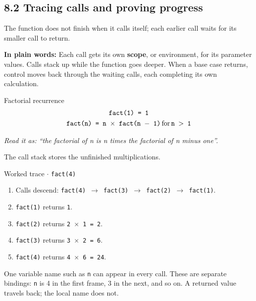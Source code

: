 \documentclass[11pt]{article}
\begin{document}
\begin{keepsection}
\section{8.2 Tracing calls and proving progress}

The function does not finish when it calls itself; each earlier call waits for its smaller call to return.

\begin{plainbox}\textbf{In plain words:} Each call gets its own \textbf{scope}, or environment, for its parameter values. Calls stack up while the function goes deeper. When a base case returns, control moves back through the waiting calls, each completing its own calculation.\end{plainbox}

\begin{equationcard}{Factorial recurrence}
\[ \begin{gathered} \texttt{fact(1) = 1} \\ \texttt{fact(n) = n \ensuremath{\times} fact(n \ensuremath{-} 1)}\, \text{for}\, \texttt{n \ensuremath{>} 1} \end{gathered} \]
{\small \emph{Read it as: “the factorial of n is n times the factorial of n minus one”.}\par  The call stack stores the unfinished multiplications.}
\end{equationcard}

\begin{workedbox}{Worked trace \ensuremath{\cdot} \texttt{fact(4)}}
\begin{enumerate}
\item Calls descend: \texttt{fact(4) \ensuremath{\to} fact(3) \ensuremath{\to} fact(2) \ensuremath{\to} fact(1)}.
\item \texttt{fact(1)} returns \texttt{1}.
\item \texttt{fact(2)} returns \texttt{2 \ensuremath{\times} 1 = 2}.
\item \texttt{fact(3)} returns \texttt{3 \ensuremath{\times} 2 = 6}.
\item \texttt{fact(4)} returns \texttt{4 \ensuremath{\times} 6 = 24}.
\end{enumerate}
\end{workedbox}

One variable name such as \texttt{n} can appear in every call. These are separate bindings: \texttt{n} is 4 in the first frame, 3 in the next, and so on. A returned value travels back; the local name does not.


\end{keepsection}
\end{document}
